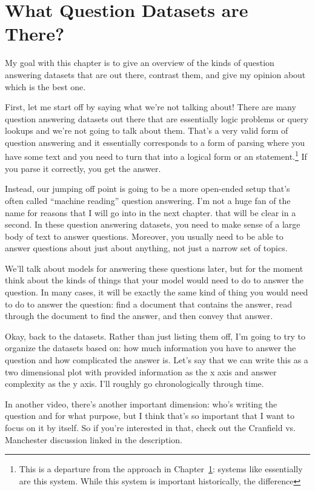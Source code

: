\label{chapter:nq}

\section{What Question Datasets are There?}

My goal with this chapter is to give an overview of the kinds of
question answering datasets that are out there, contrast them, and
give my opinion about which is the best one.

First, let me start off by saying what we're not talking about!  There
are many question answering datasets out there that are essentially
logic problems or  query lookups and we're not going to talk
about them.
%
That's a very valid form of question answering and it essentially
corresponds to a form of parsing where you have some text and you need
to turn that into a logical form or an 
statement.\footnote{This is a departure from the approach in
  Chapter~\ref{}: systems like  essentially are this
  system.  While this system is important historically, the difference
 }
%
If you parse it correctly, you get the answer.

Instead, our jumping off point is going to be a more open-ended setup
that’s often called “machine reading” question answering.
%
I'm not a huge fan of the name for reasons that I will go into in the next chapter.
that will be clear in a second.  In these question answering datasets,
you need to make sense of a large body of text to answer questions.
Moreover, you usually need to be able to answer questions about just
about anything, not just a narrow set of topics.

We'll talk about models for answering these questions later, but for the moment think about the kinds of things that your model would need to do to answer the question.  In many cases, it will be exactly the same kind of thing you would need to do to answer the question: find a document that contains the answer, read through the document to find the answer, and then convey that answer.

Okay, back to the datasets.  Rather than just listing them off, I’m going to try to organize the datasets based on: how much information you have to answer the question and how complicated the answer is.  Let’s say that we can write this as a two dimensional plot with provided information as the x axis and answer complexity as the y axis.  I’ll roughly go chronologically through time.

In another video, there’s another important dimension: who’s writing the question and for what purpose, but I think that’s so important that I want to focus on it by itself.  So if you’re interested in that, check out the Cranfield vs. Manchester discussion linked in the description. 

